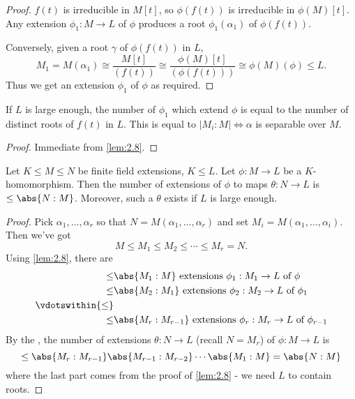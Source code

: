 \documentclass{article}
\begin{document}
\begin{proof}
    $f(t)$ is irreducible in $M[t]$, so $\phi(f(t))$ is irreducible in $\phi(M)[t]$.
    Any extension $\phi_1: M \to L$ of $\phi$ produces a root $\phi_1(\alpha_1)$ of $\phi(f(t))$.

    Conversely, given a root $\gamma$ of $\phi(f(t))$ in $L$,
    \begin{equation*}
        M_1 = M(\alpha_1) \cong \frac{M[t]}{(f(t))} \cong \frac{\phi(M)[t]}{(\phi(f(t)))} \cong \phi(M)(\phi) \leq L.
    \end{equation*}
    Thus we get an extension $\phi_1$ of $\phi$ as required.
\end{proof}
\begin{ncor}\label{cor:2.9}
    If $L$ is large enough, the number of $\phi_1$ which extend $\phi$ is equal to the number of distinct roots of $f(t)$ in $L$.
    This is equal to $|M_i:M| \iff \alpha$ is separable over $M$.
\end{ncor}
\begin{proof}
    Immediate from \cref{lem:2.8}.
\end{proof}
\begin{ncor}\label{cor:2.10}
    Let $K \leq M \leq N$ be finite field extensions, $K \leq L$. Let $\phi: M \to L$ be a $K$-homomorphism.
    Then the number of extensions of $\phi$ to maps $\theta:N \to L$ is $\leq \abs{N:M}$.
    Moreover, such a $\theta$ exists if $L$ is large enough.
\end{ncor}
\begin{proof}
    Pick $\alpha_1, \dotsc, \alpha_r$ so that $N = M(\alpha_1, \dotsc, \alpha_r)$ and set $M_i = M(\alpha_1, \dotsc,\alpha_i)$. Then we've got
    \begin{equation*}
        M \leq M_1 \leq M_2 \leq \dotsb \leq M_r = N.
    \end{equation*}
    Using \cref{lem:2.8}, there are
    \begin{align*}
        \leq& \abs{M_1:M} \text{ extensions } \phi_1 : M_1 \to L \text{ of } \phi \\
        \leq& \abs{M_2:M_1} \text{ extensions } \phi_2 : M_2 \to L \text{ of } \phi_1 \\
        \vdotswithin{\leq}\\
        \leq& \abs{M_r:M_{r-1}} \text{ extensions } \phi_r : M_r \to L \text{ of } \phi_{r-1}
    \end{align*}
    By the , the number of extensions $\theta: N \to L$ (recall $N=M_r$) of $\phi:M \to L$ is
    \begin{equation*}
        \leq \abs{M_r:M_{r-1}} \abs{M_{r-1}:M_{r-2}} \cdots \abs{M_1:M} = \abs{N:M}
    \end{equation*}
    where the last part comes from the proof of \cref{lem:2.8} - we need $L$ to contain roots.
\end{proof}
\end{document}
